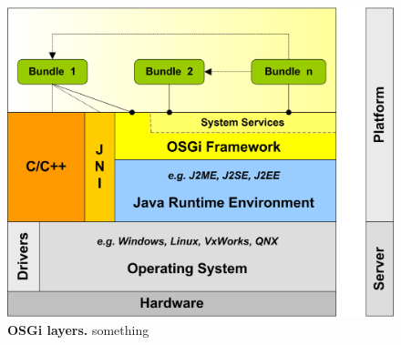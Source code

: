 \begin{figure}[htbp]
	\begin{center}
		\includegraphics[scale=1.3]{pics/osgi_layer.png}
	\caption[OSGi layers]{
	\textbf{OSGi layers.}
	something}
	\end{center}
	\label{fig:osgi_layer}
\end{figure}



